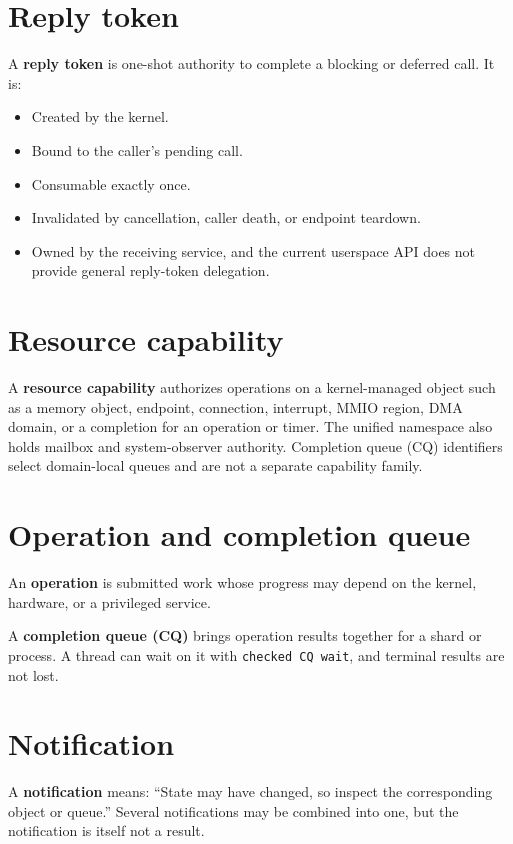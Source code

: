 \section{Reply token}

A \textbf{reply token} is one-shot authority to complete a blocking or deferred
call. It is:

\begin{itemize}
    \item Created by the kernel.
    \item Bound to the caller's pending call.
    \item Consumable exactly once.
    \item Invalidated by cancellation, caller death, or endpoint teardown.
    \item Owned by the receiving service, and the current userspace API does not
        provide general reply-token delegation.
\end{itemize}

\section{Resource capability}

A \textbf{resource capability} authorizes operations on a kernel-managed object
such as a memory object, endpoint, connection, interrupt, MMIO region, DMA domain,
or a completion for an operation or timer. The unified namespace also holds
mailbox and system-observer authority. Completion queue (CQ) identifiers select
domain-local queues and are not a separate capability family.

\section{Operation and completion queue}

An \textbf{operation} is submitted work whose progress may depend on the kernel,
hardware, or a privileged service.

A \textbf{completion queue (CQ)} brings operation results together for a shard
or process. A thread can wait on it with \texttt{checked CQ wait}, and terminal
results are not lost.

\section{Notification}

A \textbf{notification} means: ``State may have changed, so inspect the corresponding
object or queue.'' Several notifications may be combined into one, but the
notification is itself not a result.


